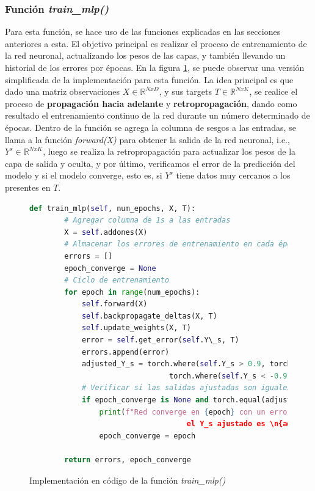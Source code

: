 \documentclass{article}
\begin{document}
\subsubsection{Función \textit{train\_mlp()}}

Para esta función, se hace uso de las funciones explicadas en las secciones anteriores a esta. El objetivo principal es realizar el proceso de entrenamiento de la red neuronal, actualizando los pesos de las capas, y también llevando un historial de los errores por épocas. En la figura \ref{code:train_mlp}, se puede observar una versión simplificada de la implementación para esta función. La idea principal es que dado una matriz observaciones $X \in \mathbb{R}^{NxD}$, y sus targets $T \in \mathbb{R}^{NxK}$, se realice el proceso de \textbf{propagación hacia adelante} y \textbf{retropropagación}, dando como resultado el entrenamiento continuo de la red durante un número determinado de épocas. Dentro de la función se agrega la columna de sesgos a las entradas, se llama a la función \textit{forward(X)} para obtener la salida de la red neuronal, i.e., $Y^s \in \mathbb{R}^{NxK}$, luego se realiza la retropropagación para actualizar los pesos de la capa de salida y oculta, y por último, verificamos el error de la predicción del modelo y si el modelo converge, esto es, si $Y^s$ tiene datos muy cercanos a los presentes en $T$. 

\begin{figure}[h!]
\begin{lstlisting}[language=Python, texcl=true]
def train_mlp(self, num_epochs, X, T):
        # Agregar columna de 1s a las entradas
        X = self.addones(X)
        # Almacenar los errores de entrenamiento en cada época
        errors = []
        epoch_converge = None
        # Ciclo de entrenamiento
        for epoch in range(num_epochs):
            self.forward(X)
            self.backpropagate_deltas(X, T)
            self.update_weights(X, T)
            error = self.get_error(self.Y\_s, T)
            errors.append(error)
            adjusted_Y_s = torch.where(self.Y_s > 0.9, torch.tensor(1.), 
                                torch.where(self.Y_s < -0.9, torch.tensor(-1.), self.Y_s))
            # Verificar si las salidas ajustadas son iguales a los objetivos T
            if epoch_converge is None and torch.equal(adjusted_Y_s, T):
                print(f"Red converge en {epoch} con un error de {error}, 
                                    el Y_s ajustado es \n{adjusted_Y_s}")
                epoch_converge = epoch

        return errors, epoch_converge
\end{lstlisting}
\caption{Implementación en código de la función \textit{train\_mlp()}}
\label{code:train_mlp}
\end{figure}
\end{document}
